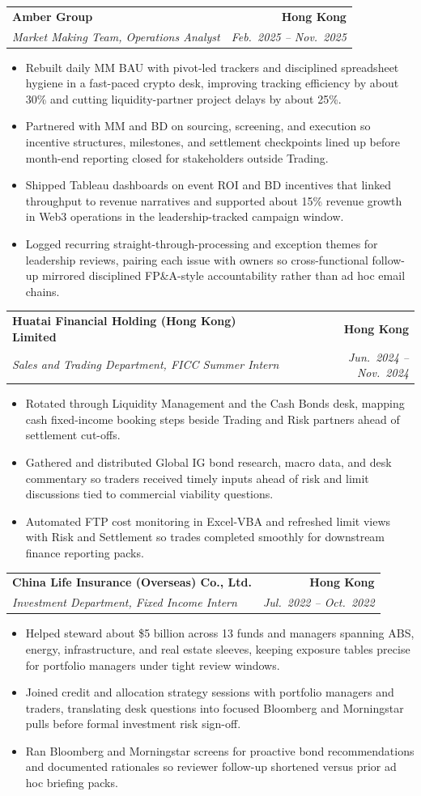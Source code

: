 \documentclass[9pt,a4paper]{extarticle}
\makeatletter
\newcommand{\resumeSubheading}[4]{%
  \vspace{0.6em}%
  \begin{tabular*}{\textwidth}{l@{\extracolsep{\fill}}r}
    \textbf{#1} & \textbf{#2} \\
    \textit{\small #3} & \textit{\small #4} \\
  \end{tabular*}\vspace{0.32em}}
\makeatother
\begin{document}
\resumeSubheading{Amber Group}{Hong Kong}{Market Making Team, Operations Analyst}{Feb.\ 2025 -- Nov.\ 2025}
\begin{itemize}
  \item Rebuilt daily MM BAU with pivot-led trackers and disciplined spreadsheet hygiene in a fast-paced crypto desk, improving tracking efficiency by about 30\% and cutting liquidity-partner project delays by about 25\%.
  \item Partnered with MM and BD on sourcing, screening, and execution so incentive structures, milestones, and settlement checkpoints lined up before month-end reporting closed for stakeholders outside Trading.
  \item Shipped Tableau dashboards on event ROI and BD incentives that linked throughput to revenue narratives and supported about 15\% revenue growth in Web3 operations in the leadership-tracked campaign window.
  \item Logged recurring straight-through-processing and exception themes for leadership reviews, pairing each issue with owners so cross-functional follow-up mirrored disciplined FP\&A-style accountability rather than ad hoc email chains.
\end{itemize}

\resumeSubheading{Huatai Financial Holding (Hong Kong) Limited}{Hong Kong}{Sales and Trading Department, FICC Summer Intern}{Jun.\ 2024 -- Nov.\ 2024}
\begin{itemize}
  \item Rotated through Liquidity Management and the Cash Bonds desk, mapping cash fixed-income booking steps beside Trading and Risk partners ahead of settlement cut-offs.
  \item Gathered and distributed Global IG bond research, macro data, and desk commentary so traders received timely inputs ahead of risk and limit discussions tied to commercial viability questions.
  \item Automated FTP cost monitoring in Excel-VBA and refreshed limit views with Risk and Settlement so trades completed smoothly for downstream finance reporting packs.
\end{itemize}

\resumeSubheading{China Life Insurance (Overseas) Co., Ltd.}{Hong Kong}{Investment Department, Fixed Income Intern}{Jul.\ 2022 -- Oct.\ 2022}
\begin{itemize}
  \item Helped steward about \$5 billion across 13 funds and managers spanning ABS, energy, infrastructure, and real estate sleeves, keeping exposure tables precise for portfolio managers under tight review windows.
  \item Joined credit and allocation strategy sessions with portfolio managers and traders, translating desk questions into focused Bloomberg and Morningstar pulls before formal investment risk sign-off.
  \item Ran Bloomberg and Morningstar screens for proactive bond recommendations and documented rationales so reviewer follow-up shortened versus prior ad hoc briefing packs.
\end{itemize}
\end{document}
